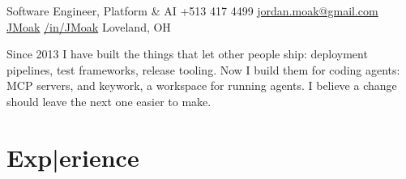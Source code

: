 \documentclass[]{moak-resume}
\begin{document}
            {Software Engineer, Platform \& AI}
            {\icon{\faPhone} +513 417 4499}
            {\icon{\faEnvelope[regular]} \href{mailto:jordan.moak@gmail.com}{ jordan.moak@gmail.com}}
            {\icon{\faGlobe} \href{https://moak.dev}{ }}
            {\icon{\faGithub} \href{https://github.com/JMoak/}{ JMoak}}
            {\icon{\faLinkedin} \href{https://www.linkedin.com/in/jmoak/}{ /in/JMoak}}
            {\icon{\faMapMarker} Loveland, OH}

\begin{aside}
  \small\bodyfont Since 2013 I have built the things that let other people ship: deployment pipelines, test frameworks, release tooling. Now I build them for coding agents: MCP servers, and keywork, a workspace for running agents. I believe a change should leave the next one easier to make.
	\focusChart{}
  ~
\end{aside}
\maincontentstart
\section{Exp|erience}
\end{document}
